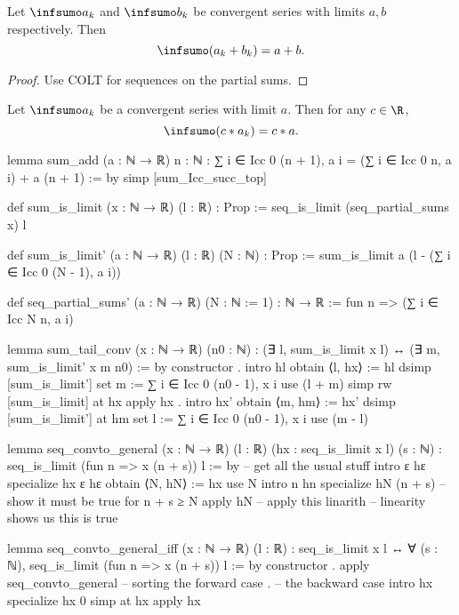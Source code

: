 \begin{theorem}\label{thm:sum_COLT_add}
    Let $\infsumo a_k$ and $\infsumo b_k$ be convergent series with limits $a, b$ respectively.
    Then
    \[
    \infsumo (a_k + b_k) = a + b.
    \]
\end{theorem}
\begin{proof}
    Use COLT for sequences on the partial sums.
\end{proof}

\begin{theorem}\label{thm:sum_COLT_scalarmult}
    Let $\infsumo a_k$ be a convergent series with limit $a$.
    Then for any $c \in \R$,
    \[
    \infsumo (c * a_k) = c * a.
    \]

lemma sum_add (a : ℕ → ℝ) {n : ℕ} : ∑ i ∈ Icc 0 (n + 1), a i = (∑ i ∈ Icc 0 n, a i) + a (n + 1) := by
  simp [sum_Icc_succ_top]

def sum_is_limit (x : ℕ → ℝ) (l : ℝ) : Prop :=
  seq_is_limit (seq_partial_sums x) l

def sum_is_limit' (a : ℕ → ℝ) (l : ℝ) (N : ℕ) : Prop :=
  sum_is_limit a (l - (∑ i ∈ Icc 0 (N - 1), a i))

def seq_partial_sums' (a : ℕ → ℝ) (N : ℕ := 1) : ℕ → ℝ :=
  fun n => (∑ i ∈ Icc N n, a i)

lemma sum_tail_conv (x : ℕ → ℝ) (n0 : ℕ) : (∃ l, sum_is_limit x l) ↔ (∃ m, sum_is_limit' x m n0) := by
  constructor
  .
    intro hl
    obtain ⟨l, hx⟩ := hl
    dsimp [sum_is_limit']
    set m := ∑ i ∈ Icc 0 (n0 - 1), x i
    use (l + m)
    simp
    rw [sum_is_limit] at hx
    apply hx
  .
    intro hx'
    obtain ⟨m, hm⟩ := hx'
    dsimp [sum_is_limit'] at hm
    set l := ∑ i ∈ Icc 0 (n0 - 1), x i
    use (m - l)

lemma seq_convto_general (x : ℕ → ℝ) (l : ℝ) (hx : seq_is_limit x l) (s : ℕ) : seq_is_limit (fun n => x (n + s)) l := by
  -- get all the usual stuff
  intro ε hε
  specialize hx ε hε
  obtain ⟨N, hN⟩ := hx
  use N
  intro n hn
  specialize hN (n + s) -- show it must be true for n + s ≥ N
  apply hN  -- apply this
  linarith  -- linearity shows us this is true

lemma seq_convto_general_iff (x : ℕ → ℝ) (l : ℝ) : seq_is_limit x l ↔ ∀ (s : ℕ), seq_is_limit (fun n => x (n + s)) l := by
  constructor
  . apply seq_convto_general  -- sorting the forward case
  . -- the backward case
    intro hx
    specialize hx 0
    simp at hx
    apply hx


\end{theorem}
